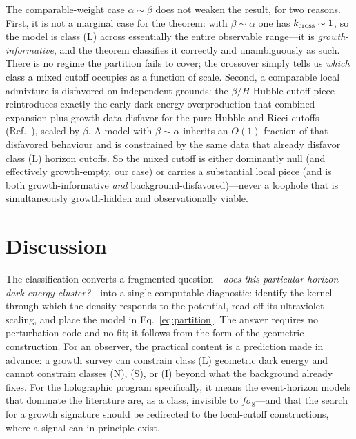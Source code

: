 \documentclass[twocolumn,10pt]{article}
\begin{document}
The comparable-weight case $\alpha\sim\beta$ does not weaken the result, for two
reasons. First, it is not a marginal case for the theorem: with $\beta\sim\alpha$
one has $k_{\rm cross}\sim1$, so the model is class (L) across essentially the
entire observable range---it is \emph{growth-informative}, and the theorem
classifies it correctly and unambiguously as such. There is no regime the
partition fails to cover; the crossover simply tells us \emph{which} class a
mixed cutoff occupies as a function of scale. Second, a comparable local
admixture is disfavored on independent grounds: the $\beta/H$ Hubble-cutoff
piece reintroduces exactly the early-dark-energy overproduction that combined
expansion-plus-growth data disfavor for the pure Hubble and Ricci cutoffs
(Ref.~\cite{Akhlaghi2018}), scaled by $\beta$. A model with $\beta\sim\alpha$
inherits an $O(1)$ fraction of that disfavored behaviour and is constrained by
the same data that already disfavor class (L) horizon cutoffs. So the mixed
cutoff is either dominantly null (and effectively growth-empty, our case) or
carries a substantial local piece (and is both growth-informative \emph{and}
background-disfavored)---never a loophole that is simultaneously growth-hidden
and observationally viable.

\section{Discussion}
\label{sec:discussion}

The classification converts a fragmented question---\emph{does this particular
horizon dark energy cluster?}---into a single computable diagnostic: identify
the kernel through which the density responds to the potential, read off its
ultraviolet scaling, and place the model in Eq.~\eqref{eq:partition}. The answer
requires no perturbation code and no fit; it follows from the form of the
geometric construction. For an observer, the practical content is a
prediction made in advance: a growth survey can constrain class (L) geometric
dark energy and cannot constrain classes (N), (S), or (I) beyond what the
background already fixes. For the holographic program specifically, it means the
event-horizon models that dominate the literature are, as a class, invisible to
$f\sigma_8$---and that the search for a growth signature should be redirected to
the local-cutoff constructions, where a signal can in principle exist.
\end{document}
